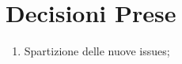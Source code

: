 \section{Decisioni Prese}
\begin{enumerate}
  \item Spartizione delle nuove issues;
\end{enumerate}
